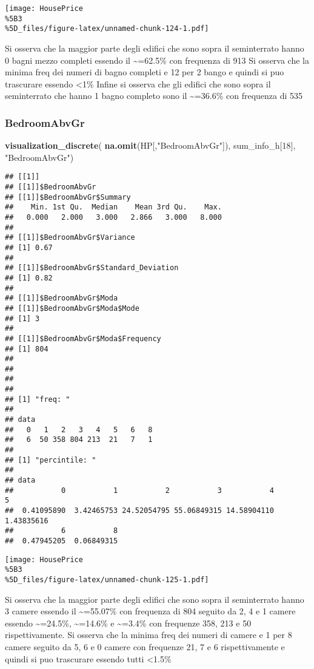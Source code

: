 \documentclass[
]{article}
\newenvironment{Shaded}{\begin{snugshade}}{\end{snugshade}}
\newcommand{\DecValTok}[1]{\textcolor[rgb]{0.00,0.00,0.81}{#1}}
\newcommand{\FunctionTok}[1]{\textcolor[rgb]{0.13,0.29,0.53}{\textbf{#1}}}
\newcommand{\NormalTok}[1]{#1}
\newcommand{\StringTok}[1]{\textcolor[rgb]{0.31,0.60,0.02}{#1}}
\begin{document}
\texttt{[image: HousePrice\\\%5B3\\\%5D\_files/figure-latex/unnamed-chunk-124-1.pdf]}

Si osserva che la maggior parte degli edifici che sono sopra il
seminterrato hanno 0 bagni mezzo completi essendo il
\textasciitilde=62.5\% con frequenza di 913 Si osserva che la minima
freq dei numeri di bagno completi e 12 per 2 bango e quindi si puo
trascurare essendo \textless1\% Infine si osserva che gli edifici che
sono sopra il seminterrato che hanno 1 bagno completo sono il
\textasciitilde=36.6\% con frequenza di 535

\subsubsection{BedroomAbvGr}\label{bedroomabvgr}

\begin{Shaded}
\begin{Highlighting}[]
\FunctionTok{visualization\_discrete}\NormalTok{(}
  \FunctionTok{na.omit}\NormalTok{(HP[,}\StringTok{"BedroomAbvGr"}\NormalTok{]),}
\NormalTok{  sum\_info\_h[}\DecValTok{18}\NormalTok{],}
  \StringTok{"BedroomAbvGr"}\NormalTok{)}
\end{Highlighting}
\end{Shaded}

\begin{verbatim}
## [[1]]
## [[1]]$BedroomAbvGr
## [[1]]$BedroomAbvGr$Summary
##    Min. 1st Qu.  Median    Mean 3rd Qu.    Max. 
##   0.000   2.000   3.000   2.866   3.000   8.000 
## 
## [[1]]$BedroomAbvGr$Variance
## [1] 0.67
## 
## [[1]]$BedroomAbvGr$Standard_Deviation
## [1] 0.82
## 
## [[1]]$BedroomAbvGr$Moda
## [[1]]$BedroomAbvGr$Moda$Mode
## [1] 3
## 
## [[1]]$BedroomAbvGr$Moda$Frequency
## [1] 804
## 
## 
## 
## 
## [1] "freq: "
## 
## data
##   0   1   2   3   4   5   6   8 
##   6  50 358 804 213  21   7   1 
## 
## [1] "percintile: "
## 
## data
##           0           1           2           3           4           5 
##  0.41095890  3.42465753 24.52054795 55.06849315 14.58904110  1.43835616 
##           6           8 
##  0.47945205  0.06849315
\end{verbatim}

\texttt{[image: HousePrice\\\%5B3\\\%5D\_files/figure-latex/unnamed-chunk-125-1.pdf]}

Si osserva che la maggior parte degli edifici che sono sopra il
seminterrato hanno 3 camere essendo il \textasciitilde=55.07\% con
frequenza di 804 seguito da 2, 4 e 1 camere essendo
\textasciitilde=24.5\%, \textasciitilde=14.6\% e \textasciitilde=3.4\%
con frequenze 358, 213 e 50 rispettivamente. Si osserva che la minima
freq dei numeri di camere e 1 per 8 camere seguito da 5, 6 e 0 camere
con frequenze 21, 7 e 6 rispettivamente e quindi si puo trascurare
essendo tutti \textless1.5\%
\end{document}
